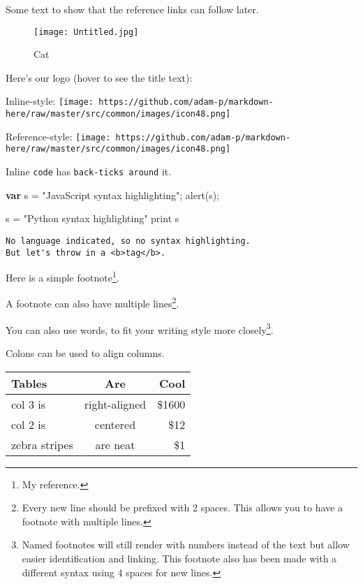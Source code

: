 \documentclass[
]{article}
\newenvironment{Shaded}{}{}
\newcommand{\BuiltInTok}[1]{\textcolor[rgb]{0.00,0.50,0.00}{#1}}
\newcommand{\FunctionTok}[1]{\textcolor[rgb]{0.02,0.16,0.49}{#1}}
\newcommand{\KeywordTok}[1]{\textcolor[rgb]{0.00,0.44,0.13}{\textbf{#1}}}
\newcommand{\NormalTok}[1]{#1}
\newcommand{\OperatorTok}[1]{\textcolor[rgb]{0.40,0.40,0.40}{#1}}
\newcommand{\StringTok}[1]{\textcolor[rgb]{0.25,0.44,0.63}{#1}}
\begin{document}
Some text to show that the reference links can follow later.

\begin{figure}
\centering
\texttt{[image: Untitled.jpg]}
\caption{Cat}
\end{figure}

Here's our logo (hover to see the title text):

Inline-style:
\texttt{[image: https://github.com/adam-p/markdown-here/raw/master/src/common/images/icon48.png]}

Reference-style:
\texttt{[image: https://github.com/adam-p/markdown-here/raw/master/src/common/images/icon48.png]}

Inline \texttt{code} has \texttt{back-ticks\ around} it.

\begin{Shaded}
\begin{Highlighting}[]
\KeywordTok{var}\NormalTok{ s }\OperatorTok{=} \StringTok{"JavaScript syntax highlighting"}\OperatorTok{;}
\FunctionTok{alert}\NormalTok{(s)}\OperatorTok{;}
\end{Highlighting}
\end{Shaded}

\begin{Shaded}
\begin{Highlighting}[]
\NormalTok{s }\OperatorTok{=} \StringTok{"Python syntax highlighting"}
\BuiltInTok{print}\NormalTok{ s}
\end{Highlighting}
\end{Shaded}

\begin{verbatim}
No language indicated, so no syntax highlighting.
But let's throw in a <b>tag</b>.
\end{verbatim}

Here is a simple footnote\footnote{My reference.}.

A footnote can also have multiple lines\footnote{Every new line should
  be prefixed with 2 spaces. This allows you to have a footnote with
  multiple lines.}.

You can also use words, to fit your writing style more
closely\footnote{Named footnotes will still render with numbers instead
  of the text but allow easier identification and linking. This footnote
  also has been made with a different syntax using 4 spaces for new
  lines.}.

Colons can be used to align columns.

\begin{longtable}[]{@{}lcr@{}}
\toprule\noalign{}
Tables & Are & Cool \\
\midrule\noalign{}
\endhead
\bottomrule\noalign{}
\endlastfoot
col 3 is & right-aligned & \$1600 \\
col 2 is & centered & \$12 \\
zebra stripes & are neat & \$1 \\
\end{longtable}
\end{document}
